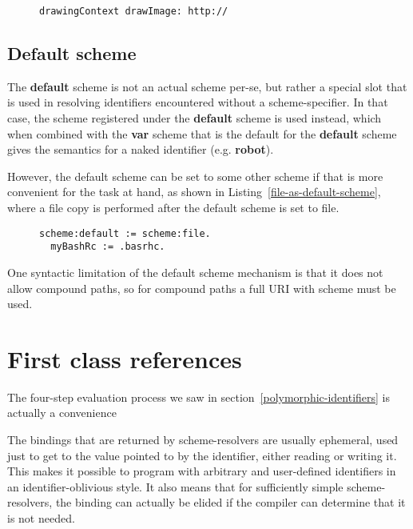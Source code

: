 \documentclass[preprint,authoryear]{acm_proc_article-sp}
\newcommand\mpw[1]{\mynote{Marcel}{#1}}
\begin{document}
\begin{figure}[htbp]
\begin{lstlisting}[style=L,label=image-drawing,caption=Drawing a remote image.]
drawingContext drawImage: http://
\end{lstlisting}
\end{figure}



\subsection{Default scheme}


The {\bf default} scheme is not an actual scheme per-se, but rather a special slot
that is used in resolving identifiers encountered without a scheme-specifier.
In that case, the scheme registered under the {\bf default} scheme is used
instead, which when combined with the {\bf var} scheme that is the default
for the {\bf default} scheme gives the semantics for a naked identifier (e.g. {\bf robot}).

However, the default scheme can be set to some other scheme if that is more
convenient for the task at hand, as shown in Listing~\ref{file-as-default-scheme},
where a file copy is performed after the default scheme is set to file.


\begin{figure}[htbp]
\begin{lstlisting}[style=L,label=file-as-default-scheme,caption=File copy with file: as default scheme.]
  scheme:default := scheme:file.
  myBashRc := .basrhc.
\end{lstlisting}
\end{figure}

One syntactic limitation of the default scheme mechanism is that it does not allow
compound paths, so for compound paths a full URI with scheme must be used.


\mpw{no changes yet beyond this point}

\section{First class references}
\label{references}
The four-step evaluation process we saw in section~\ref{polymorphic-identifiers} is
actually a convenience 

The bindings that are returned by scheme-resolvers are usually ephemeral, used just 
to get to the value pointed to by the identifier, either reading or writing it.  This
makes it possible to program with arbitrary and user-defined identifiers in
an identifier-oblivious style.  It also means that for sufficiently simple scheme-resolvers,
the binding can actually be elided if the compiler can determine that it is not needed.
\end{document}
